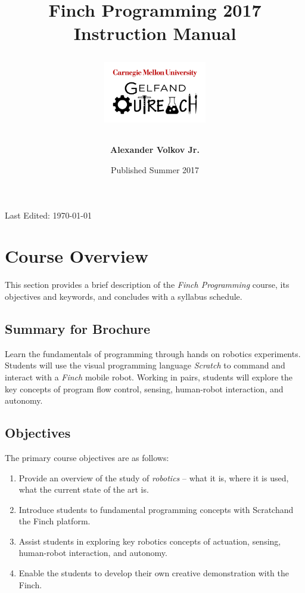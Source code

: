 \documentclass[a4paper]{article}
\title{
	\textbf{Finch Programming 2017}\\
	\onehalfspacing\Large{Instruction Manual}
	\vspace{0.5in}
	\begin{figure}[ht!]
		\centering
		\includegraphics[width=0.4\textwidth]{gelfand-logo}
	\end{figure}
	\vspace{3in}
}
\author{\textbf{Alexander Volkov Jr.}}
\date{Published Summer 2017}
\begin{document}
	
	\maketitle
	\thispagestyle{empty}
	\vfill
	\begin{center}
		\small
		Last Edited: \today
	\end{center}
	
	\newpage
	
	\tableofcontents
	
	\newpage
	
	\section{Course Overview}
	
		This section provides a brief description of the \emph{Finch Programming} course, its objectives and keywords, and concludes with a syllabus schedule.
	
	\subsection{Summary for Brochure}
		
		Learn the fundamentals of programming through hands on robotics experiments. Students will use the visual programming language \emph{Scratch} to command and interact with a \emph{Finch} mobile robot. Working in pairs, students will explore the key concepts of program flow control, sensing, human-robot interaction, and autonomy. 
	
	\subsection{Objectives}
	
		The primary course objectives are as follows:
		
		\begin{enumerate}[label=(\roman*)]
			\item Provide an overview of the study of \emph{robotics} -- what it is, where it is used, what the current state of the art is.
			\item Introduce students to fundamental programming concepts with Scratch\footnotemark[1] and the Finch platform\footnotemark[2].
			\item Assist students in exploring key robotics concepts of actuation, sensing, human-robot interaction, and autonomy.
			\item Enable the students to develop their own creative demonstration with the Finch.
		\end{enumerate}
	
\end{document}
